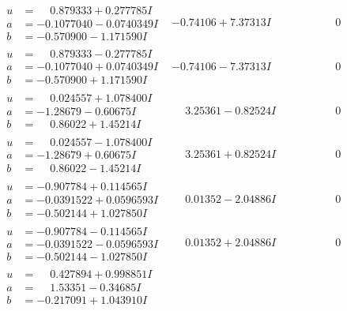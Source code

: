 \documentclass[1p]{elsarticle_modified}
\theoremstyle{definition}
\begin{document}
$$\begin{array}{c|c|c}
\begin{aligned}
u &= \phantom{-}0.879333 + 0.277785 I \\
a &= -0.1077040 - 0.0740349 I \\
b &= -0.570900 - 1.171590 I\end{aligned}
 & -0.74106 + 7.37313 I & \phantom{-0.000000 } 0 \\ \hline\begin{aligned}
u &= \phantom{-}0.879333 - 0.277785 I \\
a &= -0.1077040 + 0.0740349 I \\
b &= -0.570900 + 1.171590 I\end{aligned}
 & -0.74106 - 7.37313 I & \phantom{-0.000000 } 0 \\ \hline\begin{aligned}
u &= \phantom{-}0.024557 + 1.078400 I \\
a &= -1.28679 - 0.60675 I \\
b &= \phantom{-}0.86022 + 1.45214 I\end{aligned}
 & \phantom{-}3.25361 - 0.82524 I & \phantom{-0.000000 } 0 \\ \hline\begin{aligned}
u &= \phantom{-}0.024557 - 1.078400 I \\
a &= -1.28679 + 0.60675 I \\
b &= \phantom{-}0.86022 - 1.45214 I\end{aligned}
 & \phantom{-}3.25361 + 0.82524 I & \phantom{-0.000000 } 0 \\ \hline\begin{aligned}
u &= -0.907784 + 0.114565 I \\
a &= -0.0391522 + 0.0596593 I \\
b &= -0.502144 + 1.027850 I\end{aligned}
 & \phantom{-}0.01352 - 2.04886 I & \phantom{-0.000000 } 0 \\ \hline\begin{aligned}
u &= -0.907784 - 0.114565 I \\
a &= -0.0391522 - 0.0596593 I \\
b &= -0.502144 - 1.027850 I\end{aligned}
 & \phantom{-}0.01352 + 2.04886 I & \phantom{-0.000000 } 0 \\ \hline\begin{aligned}
u &= \phantom{-}0.427894 + 0.998851 I \\
a &= \phantom{-}1.53351 - 0.34685 I \\
b &= -0.217091 + 1.043910 I\end{aligned}

\end{array}$$
\end{document}
